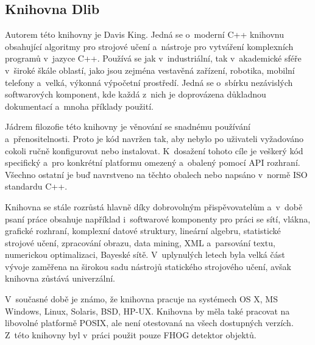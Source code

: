 \subsection{Knihovna Dlib}
Autorem této knihovny je Davis King. Jedná se o~moderní C++ knihovnu obsahující algoritmy pro strojové učení a~nástroje pro vytváření komplexních programů v~jazyce C++. Používá se jak v~industriální, tak v~akademické sféře v~široké škále oblastí, jako jsou zejména vestavěná zařízení, robotika, mobilní telefony a~velká, výkonná výpočetní prostředí. Jedná se o~sbírku nezávislých softwarových komponent, kde každá z~nich je doprovázena důkladnou dokumentací a~mnoha příklady použití.

Jádrem filozofie této knihovny je věnování se snadnému používání a~přenositelnosti. Proto je kód navržen tak, aby nebylo po uživateli vyžadováno cokoli ručně konfigurovat nebo instalovat. K~dosažení tohoto cíle je veškerý kód specifický a~pro konkrétní platformu omezený a~obalený pomocí API rozhraní. Všechno ostatní je buď navrstveno na těchto obalech nebo napsáno v~normě ISO standardu C++. 

Knihovna se stále rozrůstá hlavně díky dobrovolným přispěvovatelům a~v~době psaní práce obsahuje například i~softwarové komponenty pro práci se sítí, vlákna, grafické rozhraní, komplexní datové struktury, lineární algebru, statistické strojové učení, zpracování obrazu, data mining, XML a~parsování textu, numerickou optimalizaci, Bayeské sítě. V~uplynulých letech byla velká část vývoje zaměřena na širokou sadu nástrojů statického strojového učení, avšak knihovna zůstává univerzální.  

V~současné době je známo, že knihovna pracuje na systémech OS X, MS Windows, Linux, Solaris, BSD, HP-UX. Knihovna by měla také pracovat na libovolné platformě POSIX, ale není otestovaná na všech dostupných verzích. 
Z~této knihovny byl v~práci použit pouze FHOG detektor objektů.


